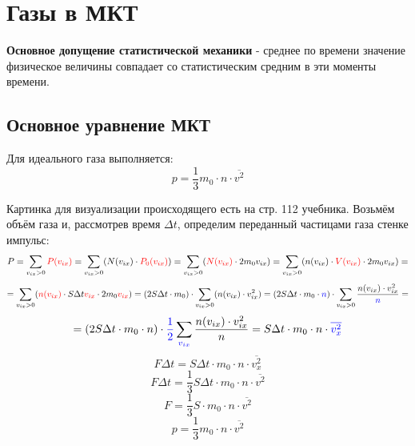 \section{Газы в МКТ}

\textbf{Основное допущение статистической механики} - среднее по времени значение физическое величины совпадает со статистическим средним в эти моменты времени.



\subsection{Основное уравнение МКТ}
\begin{oframed}
Для идеального газа выполняется:
\[p = \frac{1}{3} m_0 \cdot n \cdot \overline{v^2}\]
\end{oframed}

Картинка для визуализации происходящего есть на стр. 112 учебника. Возьмём объём газа и, рассмотрев время $\Delta t$, определим переданный частицами газа стенке импульс:
\[\displaystyle P = \sum_{v_{ix}>0}{\color{red}P(v_{ix})}=\sum_{v_{ix}>0}(N(v_{ix})\cdot{\color{red}P_0(v_{ix})})=\sum_{v_{ix}>0}({\color{red}N(v_{ix})}\cdot2 m_0 v_{ix})=
\sum_{v_{ix}>0}(n(v_{ix})\cdot {\color{red}V(v_{ix})}\cdot2 m_0 v_{ix})=
\]
\[=\sum_{v_{ix}>0}({\color{red}n(v_{ix})}\cdot S \Delta t {\color{red}v_{ix}}\cdot2 m_0 {\color{red}v_{ix}})=
(2S \Delta t \cdot m_0) \cdot \sum_{v_{ix}>0}(n(v_{ix})\cdot v_{ix}^2)=
(2S \Delta t \cdot m_0 \cdot {\color{blue}n}) \cdot \sum_{v_{ix}>0}\frac{n(v_{ix})\cdot v_{ix}^2}{\color{blue}n}=\]
\[
=(2S \Delta t \cdot m_0 \cdot n) \cdot {\color{blue}\frac{1}{2}}\sum_{\color{blue}v_{ix}}\frac{n(v_{ix})\cdot v_{ix}^2}{n}=
S \Delta t \cdot m_0 \cdot n \cdot {\color{blue}\overline{v_{x}^2}}
\]
\[F \Delta t = S \Delta t \cdot m_0 \cdot n \cdot \overline{v_{x}^2}\]
\[F \Delta t = \frac{1}{3} S \Delta t \cdot m_0 \cdot n \cdot \overline{v^2}\]
\[F = \frac{1}{3} S \cdot m_0 \cdot n \cdot \overline{v^2}\]
\[p = \frac{1}{3} m_0 \cdot n \cdot \overline{v^2}\]




